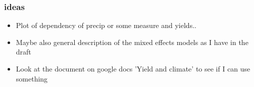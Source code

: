 \documentclass{beamer}              %
\begin{document}


\begin{frame}

\frametitle{ideas}

\begin{itemize}
\color{red}
\item Plot of dependency of precip or some measure and yields..
\item Maybe also general description of the mixed effects models as I have in the draft
\item Look at the document on google docs 'Yield and climate' to see if I can use something
\end{itemize}
\color{black}
\end{frame}

\end{document}
